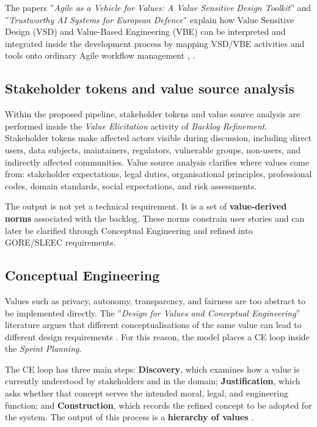 \documentclass[11pt,a4paper]{article}
\begin{document}
The papers ''\textit{Agile as a Vehicle for Values: A Value Sensitive Design Toolkit}'' and ''\textit{Trustworthy AI Systems for European Defence}'' explain how Value Sensitive Design (VSD) and Value-Based Engineering (VBE) can be interpreted and integrated inside the development process by mapping VSD/VBE activities and tools onto ordinary Agile workflow management \cite[Secs.~3--5]{vsd}, \cite[Sec.~7.1]{taid_whitepaper}.

\subsection{Stakeholder tokens and value source analysis}

Within the proposed pipeline, stakeholder tokens and value source analysis are performed inside the \textit{Value Elicitation} activity of \textit{Backlog Refinement}. Stakeholder tokens make affected actors visible during discussion, including direct users, data subjects, maintainers, regulators, vulnerable groups, non-users, and indirectly affected communities. Value source analysis clarifies where values come from: stakeholder expectations, legal duties, organisational principles, professional codes, domain standards, social expectations, and risk assessments.

The output is not yet a technical requirement. It is a set of \textbf{value-derived norms} associated with the backlog. These norms constrain user stories and can later be clarified through Conceptual Engineering and refined into GORE/SLEEC requirements.

\subsection{Conceptual Engineering}

Values such as privacy, autonomy, transparency, and fairness are too abstract to be implemented directly. The ''\textit{Design for Values and Conceptual Engineering}'' literature argues that different conceptualisations of the same value can lead to different design requirements \cite[Secs.~2--4]{veluwenkamp_ce}. For this reason, the model places a CE loop inside the \textit{Sprint Planning}.

The CE loop has three main steps: \textbf{Discovery}, which examines how a value is currently understood by stakeholders and in the domain; \textbf{Justification}, which asks whether that concept serves the intended moral, legal, and engineering function; and \textbf{Construction}, which records the refined concept to be adopted for the system. The output of this process is a \textbf{hierarchy of values} \cite[Sec.~5]{veluwenkamp_ce}. 
\end{document}
